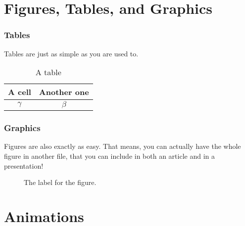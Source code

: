 \documentclass[english, aspectratio=169]{beamer}
\begin{document}
\section{Figures, Tables, and Graphics}
\begin{frame}
  \frametitle{Tables}
  Tables are just as simple as you are used to.

  \begin{table}
    \centering
    \begin{tabular}{c|c}
      A cell & Another one
      \\ \hline
      $\gamma$ & $\beta$
    \end{tabular}
    
    \caption{A table}
    \label{tab:label}
  \end{table}  
\end{frame}


\begin{frame}
  \frametitle{Graphics}
  Figures are also exactly as easy. That means, you can actually have the whole
  figure in another file, that you can include in both an article and in a
  presentation!

  \begin{figure}
    \centering
    

    \caption{The label for the figure.}
    \label{fig:label}
  \end{figure}
\end{frame}


\section{Animations}
\end{document}

